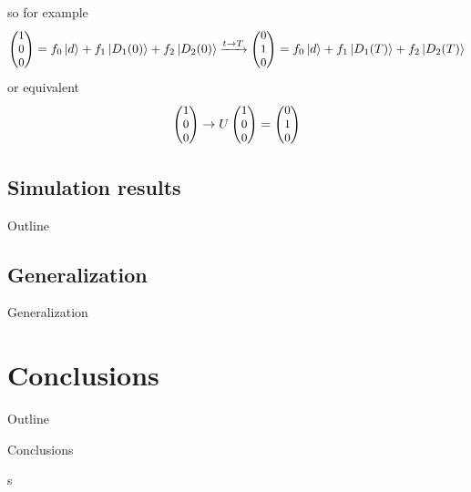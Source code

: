 \documentclass[t]{beamer}
\begin{document}
\begin{frame}
so for example
\begin{equation}\small
\begin{pmatrix}
1\\
0\\
0
\end{pmatrix}
= f_0 \ket{d} + f_1\ket{D_1(0)} + f_2\ket{D_2(0)} \xrightarrow{t\rightarrow T} \begin{pmatrix}
0\\
1\\
0
\end{pmatrix}
= f_0 \ket{d} + f_1\ket{D_1(T)} + f_2\ket{D_2(T)}
\end{equation}
or equivalent 
\begin{equation}\small
\begin{pmatrix}
1\\
0\\
0
\end{pmatrix}
\rightarrow U\begin{pmatrix}
1\\
0\\
0
\end{pmatrix}
= 
\begin{pmatrix}
0\\
1\\
0
\end{pmatrix}
\end{equation}


\end{frame}

\subsection{Simulation results}
\begin{frame}{Outline}
\tableofcontents[ 
currentsubsection, 
hideothersubsections, 
sectionstyle=show/shaded, 
subsectionstyle=show/shaded, 
] 
\end{frame}

\subsection{Generalization}
\begin{frame}{Generalization}

\end{frame}

\section{Conclusions}

\begin{frame}{Outline}
\tableofcontents[ 
currentsubsection, 
hideothersubsections, 
sectionstyle=show/shaded, 
subsectionstyle=show/shaded, 
] 
\end{frame}
\begin{frame}{Conclusions}

\end{frame}s
\end{document}
